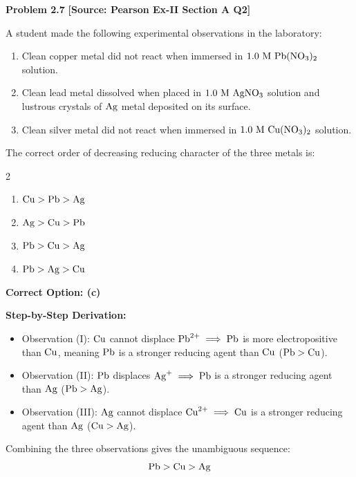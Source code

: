 \begin{problembox}
\textbf{Problem 2.7} \hfill \textbf{[Source: Pearson Ex-II Section A Q2]}

A student made the following experimental observations in the laboratory:
\begin{enumerate}[label=(\Roman*)]
    \item Clean copper metal did not react when immersed in $1.0\text{ M } \ce{Pb(NO3)2}$ solution.
    \item Clean lead metal dissolved when placed in $1.0\text{ M } \ce{AgNO3}$ solution and lustrous crystals of $\ce{Ag}$ metal deposited on its surface.
    \item Clean silver metal did not react when immersed in $1.0\text{ M } \ce{Cu(NO3)2}$ solution.
\end{enumerate}
The correct order of decreasing reducing character of the three metals is:
\begin{multicols}{2}
\begin{enumerate}[label=(\alph*)]
    \item $\ce{Cu} > \ce{Pb} > \ce{Ag}$
    \item $\ce{Ag} > \ce{Cu} > \ce{Pb}$
    \item $\ce{Pb} > \ce{Cu} > \ce{Ag}$
    \item $\ce{Pb} > \ce{Ag} > \ce{Cu}$
\end{enumerate}
\end{multicols}
\end{problembox}
\begin{solution}
\textbf{Correct Option: (c)}

\textbf{Step-by-Step Derivation:}
\begin{itemize}
    \item Observation (I): $\ce{Cu}$ cannot displace $\ce{Pb^2+} \implies \ce{Pb}$ is more electropositive than $\ce{Cu}$, meaning $\ce{Pb}$ is a stronger reducing agent than $\ce{Cu}$ ($\ce{Pb} > \ce{Cu}$).
    \item Observation (II): $\ce{Pb}$ displaces $\ce{Ag+} \implies \ce{Pb}$ is a stronger reducing agent than $\ce{Ag}$ ($\ce{Pb} > \ce{Ag}$).
    \item Observation (III): $\ce{Ag}$ cannot displace $\ce{Cu^2+} \implies \ce{Cu}$ is a stronger reducing agent than $\ce{Ag}$ ($\ce{Cu} > \ce{Ag}$).
\end{itemize}
Combining the three observations gives the unambiguous sequence:
\begin{equation*}
    \ce{Pb} > \ce{Cu} > \ce{Ag}
\end{equation*}
\end{solution}

